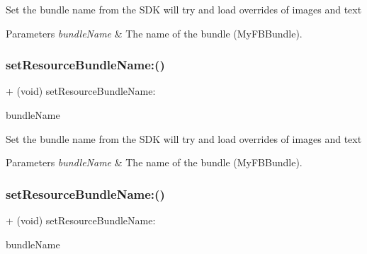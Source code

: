 Set the bundle name from the S\+DK will try and load overrides of images and text


\begin{DoxyParams}{Parameters}
{\em bundle\+Name} & The name of the bundle (My\+F\+B\+Bundle). \\
\hline
\end{DoxyParams}
\mbox{\label{interfaceFBSettings_a60a15470e22d07ad1c7d4a789712e3c1}} 
\subsubsection{\texorpdfstring{set\+Resource\+Bundle\+Name\+:()}{setResourceBundleName:()}\hspace{0.1cm}{\footnotesize\ttfamily [3/5]}}
{\footnotesize\ttfamily + (void) set\+Resource\+Bundle\+Name\+: \begin{DoxyParamCaption}\item[{(N\+S\+String $\ast$)}]{bundle\+Name }\end{DoxyParamCaption}}

Set the bundle name from the S\+DK will try and load overrides of images and text


\begin{DoxyParams}{Parameters}
{\em bundle\+Name} & The name of the bundle (My\+F\+B\+Bundle). \\
\hline
\end{DoxyParams}
\mbox{\label{interfaceFBSettings_a60a15470e22d07ad1c7d4a789712e3c1}} 
\subsubsection{\texorpdfstring{set\+Resource\+Bundle\+Name\+:()}{setResourceBundleName:()}\hspace{0.1cm}{\footnotesize\ttfamily [4/5]}}
{\footnotesize\ttfamily + (void) set\+Resource\+Bundle\+Name\+: \begin{DoxyParamCaption}\item[{(N\+S\+String $\ast$)}]{bundle\+Name }\end{DoxyParamCaption}}

